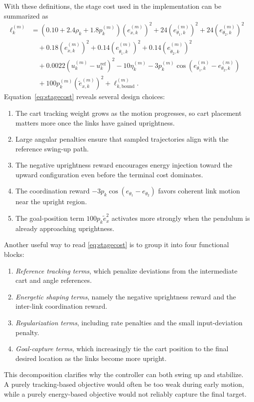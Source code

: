 \documentclass[conference]{IEEEtran}
\begin{document}
With these definitions, the stage cost used in the implementation can be summarized as
\begin{align}
\ell_k^{(m)} &=
\left(0.10 + 2.4\rho_k + 1.8p_k^{(m)}\right) \left(e_{x,k}^{(m)}\right)^2
+ 24 \left(e_{\theta_1,k}^{(m)}\right)^2
+ 24 \left(e_{\theta_2,k}^{(m)}\right)^2 \nonumber \\
&\quad + 0.18 \left(e_{\dot{x},k}^{(m)}\right)^2
+ 0.14 \left(e_{\dot{\theta}_1,k}^{(m)}\right)^2
+ 0.14 \left(e_{\dot{\theta}_2,k}^{(m)}\right)^2 \nonumber \\
&\quad + 0.0022 \left(u_k^{(m)} - u_k^{\mathrm{ref}}\right)^2
- 10 \eta_k^{(m)}
- 3 p_k^{(m)} \cos\!\left(e_{\theta_1,k}^{(m)} - e_{\theta_2,k}^{(m)}\right) \nonumber \\
&\quad + 100 p_k^{(m)} \left(\tilde{e}_{x,k}^{(m)}\right)^2
+ \ell_{k,\mathrm{bound}}^{(m)}.
\label{eq:stagecost}
\end{align}
Equation~\eqref{eq:stagecost} reveals several design choices:
\begin{enumerate}
\item The cart tracking weight grows as the motion progresses, so cart placement matters more once the links have gained uprightness.
\item Large angular penalties ensure that sampled trajectories align with the reference swing-up path.
\item The negative uprightness reward encourages energy injection toward the upward configuration even before the terminal cost dominates.
\item The coordination reward $-3p_k\cos(e_{\theta_1}-e_{\theta_2})$ favors coherent link motion near the upright region.
\item The goal-position term $100p_k\tilde{e}_x^2$ activates more strongly when the pendulum is already approaching uprightness.
\end{enumerate}

Another useful way to read \eqref{eq:stagecost} is to group it into four functional blocks:
\begin{enumerate}
\item \emph{Reference tracking terms}, which penalize deviations from the intermediate cart and angle references.
\item \emph{Energetic shaping terms}, namely the negative uprightness reward and the inter-link coordination reward.
\item \emph{Regularization terms}, including rate penalties and the small input-deviation penalty.
\item \emph{Goal-capture terms}, which increasingly tie the cart position to the final desired location as the links become more upright.
\end{enumerate}
This decomposition clarifies why the controller can both swing up and stabilize. A purely tracking-based objective would often be too weak during early motion, while a purely energy-based objective would not reliably capture the final target.
\end{document}
